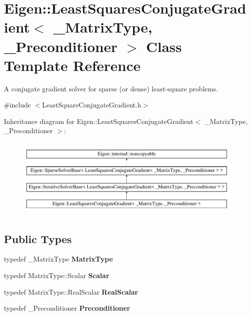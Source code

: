 \hypertarget{class_eigen_1_1_least_squares_conjugate_gradient}{}\section{Eigen\+::Least\+Squares\+Conjugate\+Gradient$<$ \+\_\+\+Matrix\+Type, \+\_\+\+Preconditioner $>$ Class Template Reference}
\label{class_eigen_1_1_least_squares_conjugate_gradient}


A conjugate gradient solver for sparse (or dense) least-\/square problems.  




{\ttfamily \#include $<$Least\+Square\+Conjugate\+Gradient.\+h$>$}

Inheritance diagram for Eigen\+::Least\+Squares\+Conjugate\+Gradient$<$ \+\_\+\+Matrix\+Type, \+\_\+\+Preconditioner $>$\+:\begin{figure}[H]
\begin{center}
\leavevmode
\includegraphics[height=3.957597cm]{class_eigen_1_1_least_squares_conjugate_gradient}
\end{center}
\end{figure}
\subsection*{Public Types}
\begin{DoxyCompactItemize}
\item 
\mbox{\label{class_eigen_1_1_least_squares_conjugate_gradient_a56c5362953670bfd8cfa31a51d18ee47}} 
typedef \+\_\+\+Matrix\+Type {\bfseries Matrix\+Type}
\item 
\mbox{\label{class_eigen_1_1_least_squares_conjugate_gradient_a9b8be7215e7a9d0871517ccee24d9857}} 
typedef Matrix\+Type\+::\+Scalar {\bfseries Scalar}
\item 
\mbox{\label{class_eigen_1_1_least_squares_conjugate_gradient_a81b0c2843b7d4118c8cf0529bc21924d}} 
typedef Matrix\+Type\+::\+Real\+Scalar {\bfseries Real\+Scalar}
\item 
\mbox{\label{class_eigen_1_1_least_squares_conjugate_gradient_addeb2525fd746662bee305d73f360204}} 
typedef \+\_\+\+Preconditioner {\bfseries Preconditioner}
\end{DoxyCompactItemize}
